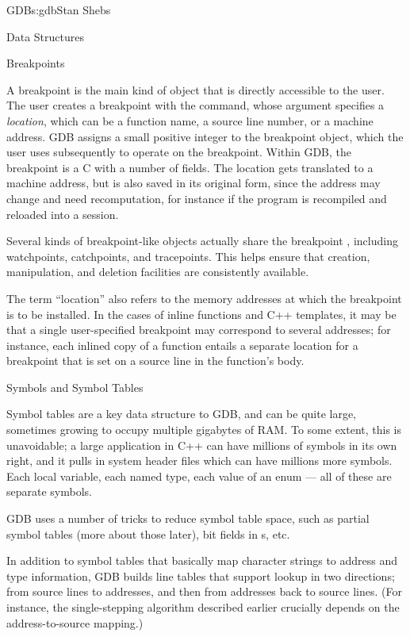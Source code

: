 \begin{aosachapter}{GDB}{s:gdb}{Stan Shebs}
\begin{aosasect1}{Data Structures}
\end{aosasect1}

\begin{aosasect2}{Breakpoints}

A breakpoint is the main kind of object that is directly accessible to
the user.  The user creates a breakpoint with the 
command, whose argument specifies a {\em location}, which can be a
function name, a source line number, or a machine address.  GDB
assigns a small positive integer to the breakpoint object, which the
user uses subsequently to operate on the breakpoint.  Within GDB, the
breakpoint is a C  with a number of fields.  The location gets
translated to a machine address, but is also saved in its original
form, since the address may change and need recomputation, for
instance if the program is recompiled and reloaded into a session.

Several kinds of breakpoint-like objects actually share the breakpoint
, including watchpoints, catchpoints, and tracepoints.  This
helps ensure that creation, manipulation, and deletion facilities are
consistently available.

The term ``location'' also refers to the memory addresses at which the
breakpoint is to be installed.  In the cases of inline functions and
C++ templates, it may be that a single user-specified breakpoint may
correspond to several addresses; for instance, each inlined copy of a
function entails a separate location for a breakpoint that is set on a
source line in the function's body.

\end{aosasect2}

\begin{aosasect2}{Symbols and Symbol Tables}

Symbol tables are a key data structure to GDB, and can be quite large,
sometimes growing to occupy multiple gigabytes of RAM.  To some
extent, this is unavoidable; a large application in C++ can have
millions of symbols in its own right, and it pulls in system header
files which can have millions more symbols.  Each local variable, each
named type, each value of an enum --- all of these are separate symbols.

GDB uses a number of tricks to reduce symbol table space, such as
partial symbol tables (more about those later), bit fields in s,
etc.

In addition to symbol tables that basically map character strings to
address and type information, GDB builds line tables that support
lookup in two directions; from source lines to addresses, and then
from addresses back to source lines.  (For instance, the
single-stepping algorithm described earlier crucially depends on the
address-to-source mapping.)


\end{aosasect2}
\end{aosachapter}
